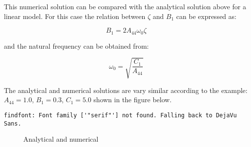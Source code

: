     

    This numerical solution can be compared with the analytical solution
above for a linear model. For this case the relation between \(\zeta\)
and \(B_1\) can be expressed as:
 
            
    
    \begin{equation}
B_{1} = 2 A_{44} \omega_{0} \zeta
\label{eq:equation}
\end{equation}

    

    and the natural frequency can be obtained from:
 
            
    
    \begin{equation}
\omega_{0} = \sqrt{\frac{C_{1}}{A_{44}}}
\label{eq:equation}
\end{equation}

    

    The analytical and numerical solutions are vary similar according to the
example: \(A_{44} = 1.0\), \(B_1 = 0.3\), \(C_1 = 5.0\) shown in the
figure below.

    \begin{Verbatim}[commandchars=\\\{\}]
findfont: Font family ['"serif"'] not found. Falling back to DejaVu Sans.
    \end{Verbatim}

    \begin{figure}
        \begin{center}\end{center}
        \caption{Analytical and numerical}
        \label{fig:analytical_numerical}
    \end{figure}
    
    